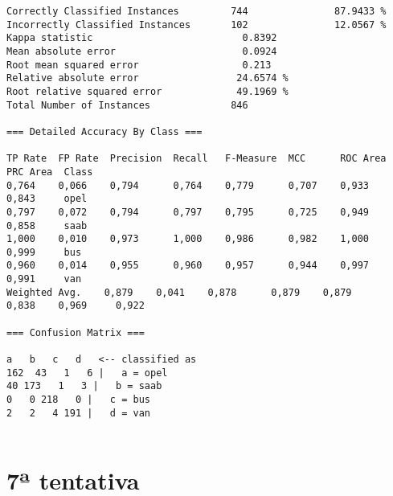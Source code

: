 \documentclass[
	article,			%
	11pt,				%
	oneside,			%
	a4paper,			%
	english,			%
	brazil,				%
	sumario=tradicional
	]{abntex2}
\begin{document}
\begin{lstlisting}
Correctly Classified Instances         744               87.9433 %
Incorrectly Classified Instances       102               12.0567 %
Kappa statistic                          0.8392
Mean absolute error                      0.0924
Root mean squared error                  0.213 
Relative absolute error                 24.6574 %
Root relative squared error             49.1969 %
Total Number of Instances              846     

=== Detailed Accuracy By Class ===

TP Rate  FP Rate  Precision  Recall   F-Measure  MCC      ROC Area  PRC Area  Class
0,764    0,066    0,794      0,764    0,779      0,707    0,933     0,843     opel
0,797    0,072    0,794      0,797    0,795      0,725    0,949     0,858     saab
1,000    0,010    0,973      1,000    0,986      0,982    1,000     0,999     bus
0,960    0,014    0,955      0,960    0,957      0,944    0,997     0,991     van
Weighted Avg.    0,879    0,041    0,878      0,879    0,879      0,838    0,969     0,922     

=== Confusion Matrix ===

a   b   c   d   <-- classified as
162  43   1   6 |   a = opel
40 173   1   3 |   b = saab
0   0 218   0 |   c = bus
2   2   4 191 |   d = van


\end{lstlisting}

\section{7ª tentativa}
\end{document}
